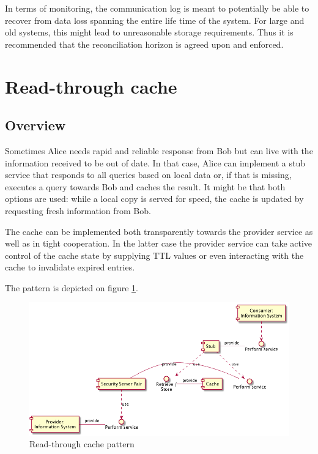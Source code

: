 \documentclass[10pt,a4paper]{article}
\begin{document}
In terms of monitoring, the communication log is meant to potentially be able to recover from data loss spanning the entire life time of the system. For large and old systems, this might lead to unreasonable storage requirements. Thus it is recommended that the reconciliation horizon is agreed upon and enforced. 

\section{Read-through cache}
\label{sec:p:13}
\subsection{Overview}

Sometimes Alice needs rapid and reliable response from Bob but can live with the information received to be out of date. In that case, Alice can implement a stub service that responds to all queries based on local data or, if that is missing, executes a query towards Bob and caches the result. It might be that both options are used: while a local copy is served for speed, the cache is updated by requesting fresh information from Bob. 

The cache can be implemented both transparently towards the provider service as well as in tight cooperation. In the latter case the provider service can take active control of the cache state by supplying TTL values or even interacting with the cache to invalidate expired entries. 

The pattern is depicted on figure \ref{fig:p:13}.

\begin{figure}[htp]
	\begin{center}
		\includegraphics[width=1\textwidth]{gfx/13_comp.png}
		\caption{Read-through cache pattern}
		\label{fig:p:13}
	\end{center}
\end{figure}
\end{document}
